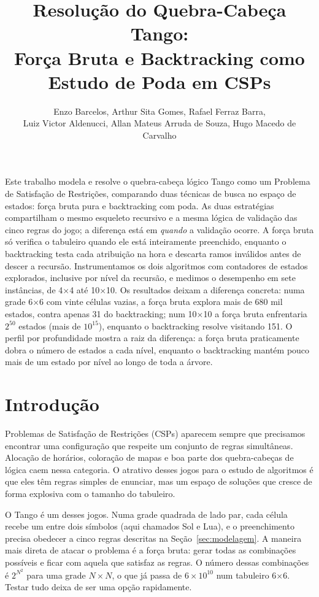 \documentclass[12pt]{article}
\title{Resolução do Quebra-Cabeça Tango:\\Força Bruta e Backtracking como Estudo de Poda em CSPs}
\author{Enzo Barcelos\inst{1}, Arthur Sita Gomes\inst{1}, Rafael Ferraz Barra\inst{1},\\
  Luiz Victor Aldenucci\inst{1}, Allan Mateus Arruda de Souza\inst{1}, Hugo Macedo de Carvalho\inst{1}}
\begin{document}
\maketitle

\begin{resumo}
  Este trabalho modela e resolve o quebra-cabeça lógico Tango como um Problema de Satisfação de Restrições, comparando duas técnicas de busca no espaço de estados: força bruta pura e backtracking com poda. As duas estratégias compartilham o mesmo esqueleto recursivo e a mesma lógica de validação das cinco regras do jogo; a diferença está em \emph{quando} a validação ocorre. A força bruta só verifica o tabuleiro quando ele está inteiramente preenchido, enquanto o backtracking testa cada atribuição na hora e descarta ramos inválidos antes de descer a recursão. Instrumentamos os dois algoritmos com contadores de estados explorados, inclusive por nível da recursão, e medimos o desempenho em sete instâncias, de 4$\times$4 até 10$\times$10. Os resultados deixam a diferença concreta: numa grade 6$\times$6 com vinte células vazias, a força bruta explora mais de 680 mil estados, contra apenas 31 do backtracking; num 10$\times$10 a força bruta enfrentaria $2^{50}$ estados (mais de $10^{15}$), enquanto o backtracking resolve visitando 151. O perfil por profundidade mostra a raiz da diferença: a força bruta praticamente dobra o número de estados a cada nível, enquanto o backtracking mantém pouco mais de um estado por nível ao longo de toda a árvore.
\end{resumo}

\section{Introdução}

Problemas de Satisfação de Restrições (CSPs) aparecem sempre que precisamos encontrar uma configuração que respeite um conjunto de regras simultâneas. Alocação de horários, coloração de mapas e boa parte dos quebra-cabeças de lógica caem nessa categoria. O atrativo desses jogos para o estudo de algoritmos é que eles têm regras simples de enunciar, mas um espaço de soluções que cresce de forma explosiva com o tamanho do tabuleiro.

O Tango é um desses jogos. Numa grade quadrada de lado par, cada célula recebe um entre dois símbolos (aqui chamados Sol e Lua), e o preenchimento precisa obedecer a cinco regras descritas na Seção~\ref{sec:modelagem}. A maneira mais direta de atacar o problema é a força bruta: gerar todas as combinações possíveis e ficar com aquela que satisfaz as regras. O número dessas combinações é $2^{N^2}$ para uma grade $N \times N$, o que já passa de $6 \times 10^{10}$ num tabuleiro 6$\times$6. Testar tudo deixa de ser uma opção rapidamente.
\end{document}

